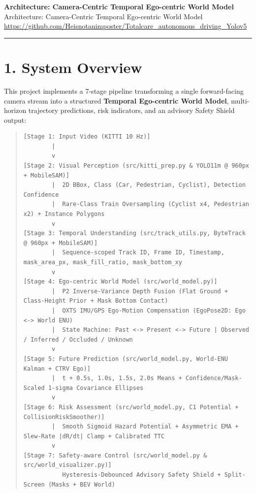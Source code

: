 \documentclass[10.5pt,a4paper]{article}
\begin{document}
\begin{center}
{\LARGE\bfseries Architecture: Camera-Centric Temporal Ego-centric World Model}\\[6pt]
{\normalsize\color{gray} Architecture: Camera-Centric Temporal Ego-centric World Model}\\[4pt]
{\small\href{https://github.com/Heisnotanimposter/Totalcare_autonomous_driving_Yolov5}{https://github.com/Heisnotanimposter/Totalcare\_autonomous\_driving\_Yolov5}}
\end{center}
\vspace{4pt}
\hrule
\vspace{8pt}

\section{1. System Overview}

This project implements a 7-stage pipeline transforming a single forward-facing camera stream into a structured \textbf{Temporal Ego-centric World Model}, multi-horizon trajectory predictions, risk indicators, and an advisory Safety Shield output:


\begin{quote}\begin{footnotesize}\begin{verbatim}
[Stage 1: Input Video (KITTI 10 Hz)]
        |
        v
[Stage 2: Visual Perception (src/kitti_prep.py & YOLO11m @ 960px + MobileSAM)]
        |  2D BBox, Class (Car, Pedestrian, Cyclist), Detection Confidence
        |  Rare-Class Train Oversampling (Cyclist x4, Pedestrian x2) + Instance Polygons
        v
[Stage 3: Temporal Understanding (src/track_utils.py, ByteTrack @ 960px + MobileSAM)]
        |  Sequence-scoped Track ID, Frame ID, Timestamp, mask_area_px, mask_fill_ratio, mask_bottom_xy
        v
[Stage 4: Ego-centric World Model (src/world_model.py)]
        |  P2 Inverse-Variance Depth Fusion (Flat Ground + Class-Height Prior + Mask Bottom Contact)
        |  OXTS IMU/GPS Ego-Motion Compensation (EgoPose2D: Ego <-> World ENU)
        |  State Machine: Past <-> Present <-> Future | Observed / Inferred / Occluded / Unknown
        v
[Stage 5: Future Prediction (src/world_model.py, World-ENU Kalman + CTRV Ego)]
        |  t + 0.5s, 1.0s, 1.5s, 2.0s Means + Confidence/Mask-Scaled 1-sigma Covariance Ellipses
        v
[Stage 6: Risk Assessment (src/world_model.py, C1 Potential + CollisionRiskSmoother)]
        |  Smooth Sigmoid Hazard Potential + Asymmetric EMA + Slew-Rate |dR/dt| Clamp + Calibrated TTC
        v
[Stage 7: Safety-aware Control (src/world_model.py & src/world_visualizer.py)]
           Hysteresis-Debounced Advisory Safety Shield + Split-Screen (Masks + BEV World)
\end{verbatim}\end{footnotesize}\end{quote}
\end{document}
